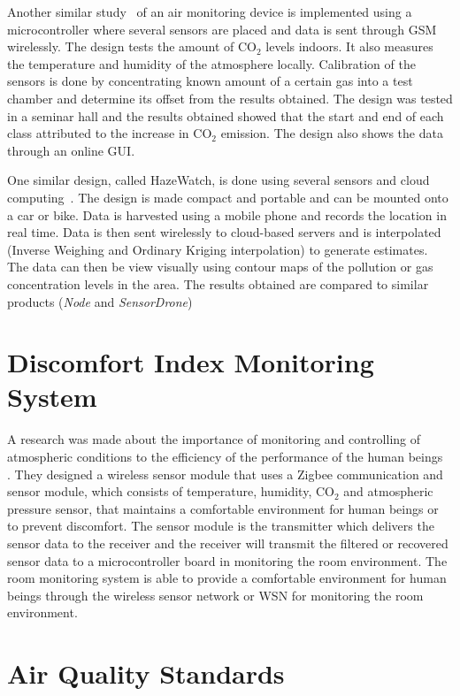 Another similar study~\cite{Hebbar} of an air monitoring device is implemented using a microcontroller where several sensors are placed and data is sent through GSM wirelessly. The design tests the amount of CO$_{2}$ levels indoors. It also measures the temperature and humidity of the atmosphere locally. Calibration of the sensors is done by concentrating known amount of a certain gas into a test chamber and determine its offset from the results obtained. The design was tested in a seminar hall and the results obtained showed that the start and end of each class attributed to the increase in CO$_{2}$ emission. The design also shows the data through an online GUI.

One similar design, called HazeWatch, is done using several sensors and cloud computing~\cite{Hu}. The design is made compact and portable and can be mounted onto a car or bike.  Data is harvested using a mobile phone and records the location in real time. Data is then sent wirelessly to cloud-based servers and is interpolated (Inverse Weighing and Ordinary Kriging interpolation) to generate estimates. The data can then be view visually using contour maps of the pollution or gas concentration levels in the area. The results obtained are compared to similar products (\textit{Node} and \textit{SensorDrone})

\section{Discomfort Index Monitoring System}

A research was made about the importance of monitoring and controlling of atmospheric conditions to the efficiency of the performance of the human beings ~\cite{Sun} . They designed a wireless sensor module that uses a Zigbee communication and sensor module, which consists of temperature, humidity, CO$_{2}$ and atmospheric pressure sensor, that maintains a comfortable environment for human beings or to prevent discomfort. The sensor module is the transmitter which delivers the sensor data to the receiver and the receiver will transmit the filtered or recovered sensor data to a microcontroller board in monitoring the room environment. The room monitoring system is able to provide a comfortable environment for human beings through the wireless sensor network or WSN for monitoring the room environment.

\section{Air Quality Standards}

